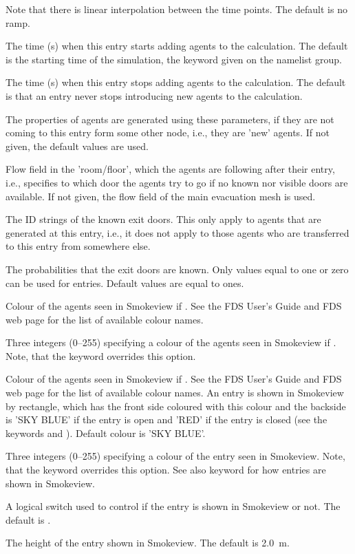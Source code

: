 \documentclass[12pt,a4paper,final,twoside]{stylevk}
\begin{document}
\begin{description}
  Note that there is linear interpolation between the time points.
  The default is no ramp.
%
\item[\Timts{TIME\_START}] The time (s) when this entry starts adding
  agents to the calculation.  The default is the starting time of the
  simulation, the  keyword given on the  
  namelist group.
%
\item[\Timts{TIME\_STOP}] The time (s) when this entry stops adding
  agents to the calculation.  The default is that an entry never stops
  introducing new agents to the calculation.
%
\item[\Timtt{PERS\_ID}] The properties of agents are generated using
  these parameters, if they are not coming to this entry form some
  other node, i.e., they are 'new' agents.  If not given, the
  default values are used.
%
\item[\Timts{FLOW\_FIELD\_ID}] Flow field in the 'room/floor', which
  the agents are following after their entry, i.e., specifies
  to which door the agents try to go if no known nor visible doors are
  available.  If not given, the flow field of the main evacuation mesh
  is used.
%
\item[\Timts{KNOWN\_DOOR\_NAMES}] The ID strings of the known exit
  doors.  This only apply to agents that are generated at this entry,
  i.e., it does not apply to those agents who are transferred to
  this entry from somewhere else.
%
\item[\Timts{KNOWN\_DOOR\_PROBS}] The probabilities that the exit
  doors are known.  Only values equal to one or zero can be used for
  entries.  Default values are equal to ones.
%
\item[\Timts{AVATAR\_COLOR}] Colour of the agents seen in Smokeview if
  .  See the FDS User's Guide and FDS web page
  for the list of available colour names. 
%
\item[\Timts{AVATAR\_RGB}] Three integers (0--255) specifying a colour
  of the agents seen in Smokeview if .  Note,
  that the  keyword overrides this option.
%
\item[\Timts{COLOR}] Colour of the agents seen in Smokeview if
  .  See the FDS User's Guide and FDS web page
  for the list of available colour names.  An entry is shown in
  Smokeview by rectangle, which has the front side coloured with this
  colour and the backside is 'SKY BLUE' if the entry is open and 'RED'
  if the entry is closed (see the keywords  and
  ).  Default colour is 'SKY BLUE'.
%
\item[\Timts{RGB}] Three integers (0--255) specifying a colour of the
  entry seen in Smokeview.  Note, that the  keyword
  overrides this option.  See also  keyword for how
  entries are shown in Smokeview.
%
\item[\Timts{SHOW}] A logical switch used to control if the entry is
  shown in Smokeview or not.  The default is .
%
\item[\Timts{HEIGHT}] The height of the entry shown in Smokeview.  The
  default is 2.0~m.
%
\end{description}
\end{document}
